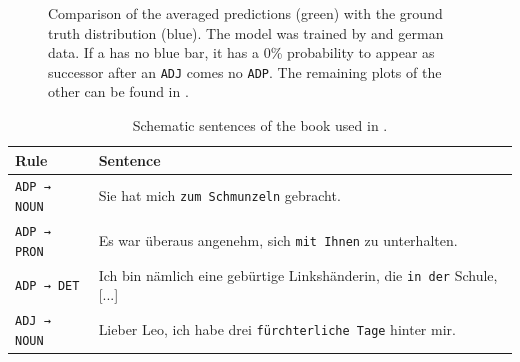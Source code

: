 \begin{figure}
{		}
	\caption{Comparison of the averaged predictions (green) with the ground truth distribution (blue). The model was trained by  and german data. If a \postag{} has no blue bar, it has a $ 0 $\% probability to appear as successor \eg after an \texttt{ADJ} comes no \texttt{ADP}. The remaining plots of the other  can be found in .}
	\label{fig: barplot det adp}
\end{figure}
\begin{table}
	\centering
	\caption[Schematic sentences for \postag{} rules]{Schematic sentences of the book used in \figref{\ref{fig: barplot det adp}}.}
	\begin{tabular}{l|l}
		\toprule
		Rule				& Sentence \\
		\midrule
		\texttt{ADP → NOUN}	& Sie hat mich \texttt{zum Schmunzeln}
		gebracht. \\
		\texttt{ADP → PRON}	& Es war überaus angenehm,
		sich \texttt{mit Ihnen} zu unterhalten. \\
		\texttt{ADP → DET}	& Ich bin nämlich eine gebürtige Linkshänderin,
		die \texttt{in der} Schule, [...] \\
		\texttt{ADJ → NOUN}	& Lieber Leo, ich habe drei \texttt{fürchterliche Tage} hinter mir. \\
		\bottomrule
	\end{tabular}
	\label{tab: example sentences}
\end{table}


